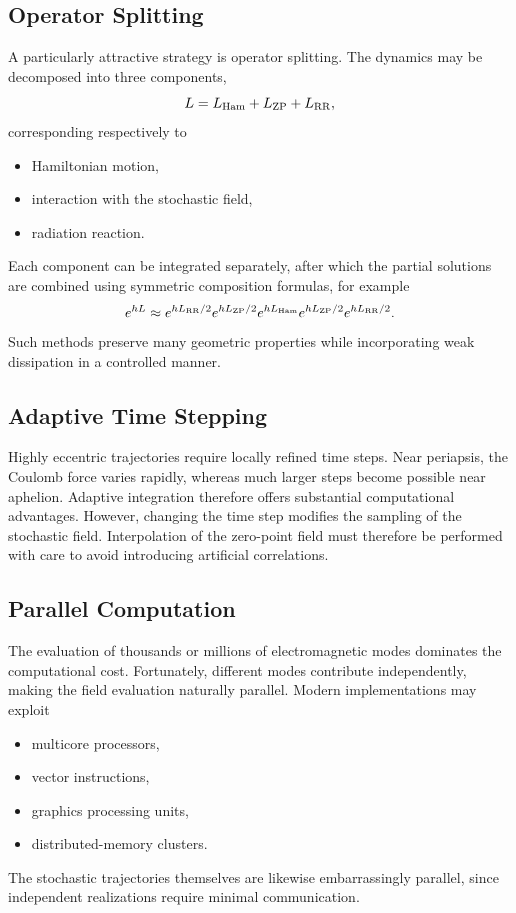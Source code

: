 \subsection{Operator Splitting}
A particularly attractive strategy is operator splitting.
The dynamics may be decomposed into three components,
\[L=L_{\rm Ham}+L_{\rm ZP}+L_{\rm RR},\]
corresponding respectively to
\begin{itemize}
\item
Hamiltonian motion,
\item
interaction with the stochastic field,
\item
radiation reaction.
\end{itemize}
Each component can be integrated separately,
after which the partial solutions are combined using symmetric
composition formulas,
for example
\[e^{hL}\approx e^{hL_{\rm RR}/2}e^{hL_{\rm ZP}/2}e^{hL_{\rm Ham}}
e^{hL_{\rm ZP}/2}e^{hL_{\rm RR}/2}.\]
Such methods preserve many geometric properties while incorporating weak
dissipation in a controlled manner.
\subsection{Adaptive Time Stepping}
Highly eccentric trajectories require locally refined time steps.
Near periapsis,
the Coulomb force varies rapidly,
whereas much larger steps become possible near aphelion.
Adaptive integration therefore offers substantial computational
advantages.
However,
changing the time step modifies the sampling of the stochastic field.
Interpolation of the zero-point field must therefore be performed with
care to avoid introducing artificial correlations.
\subsection{Parallel Computation}
The evaluation of thousands or millions of electromagnetic modes
dominates the computational cost.
Fortunately,
different modes contribute independently,
making the field evaluation naturally parallel.
Modern implementations may exploit
\begin{itemize}
\item
multicore processors,
\item
vector instructions,
\item
graphics processing units,
\item
distributed-memory clusters.
\end{itemize}
The stochastic trajectories themselves are likewise embarrassingly
parallel, since independent realizations require minimal communication.
